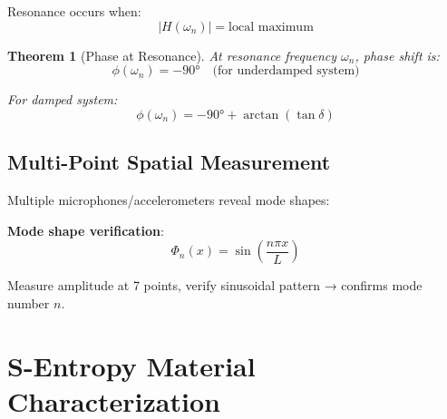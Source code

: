 \documentclass[12pt,a4paper]{article}
\newtheorem{theorem}{Theorem}
\begin{document}
Resonance occurs when:
\begin{equation}
|H(\omega_n)| = \text{local maximum}
\end{equation}

\begin{theorem}[Phase at Resonance]
At resonance frequency $\omega_n$, phase shift is:
\begin{equation}
\phi(\omega_n) = -90° \quad \text{(for underdamped system)}
\end{equation}

For damped system:
\begin{equation}
\phi(\omega_n) = -90° + \arctan(\tan\delta)
\end{equation}
\end{theorem}

\subsection{Multi-Point Spatial Measurement}

Multiple microphones/accelerometers reveal mode shapes:

\begin{center}
\end{center}

\textbf{Mode shape verification}:
\begin{equation}
\Phi_n(x) = \sin\left(\frac{n\pi x}{L}\right)
\end{equation}

Measure amplitude at 7 points, verify sinusoidal pattern → confirms mode number $n$.

\section{S-Entropy Material Characterization}
\end{document}
